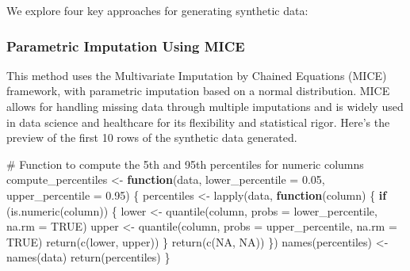 \documentclass[
  letterpaper,
  DIV=11,
  numbers=noendperiod]{scrartcl}
\newenvironment{Shaded}{\begin{snugshade}}{\end{snugshade}}
\newcommand{\AttributeTok}[1]{\textcolor[rgb]{0.40,0.45,0.13}{#1}}
\newcommand{\CommentTok}[1]{\textcolor[rgb]{0.37,0.37,0.37}{#1}}
\newcommand{\ConstantTok}[1]{\textcolor[rgb]{0.56,0.35,0.01}{#1}}
\newcommand{\ControlFlowTok}[1]{\textcolor[rgb]{0.00,0.23,0.31}{\textbf{#1}}}
\newcommand{\FloatTok}[1]{\textcolor[rgb]{0.68,0.00,0.00}{#1}}
\newcommand{\FunctionTok}[1]{\textcolor[rgb]{0.28,0.35,0.67}{#1}}
\newcommand{\NormalTok}[1]{\textcolor[rgb]{0.00,0.23,0.31}{#1}}
\newcommand{\OtherTok}[1]{\textcolor[rgb]{0.00,0.23,0.31}{#1}}
\begin{document}
We explore four key approaches for generating synthetic data:

\subsubsection{Parametric Imputation Using
MICE}\label{parametric-imputation-using-mice}

This method uses the Multivariate Imputation by Chained Equations (MICE)
framework, with parametric imputation based on a normal distribution.
MICE allows for handling missing data through multiple imputations and
is widely used in data science and healthcare for its flexibility and
statistical rigor. Here's the preview of the first 10 rows of the
synthetic data generated.

\begin{Shaded}
\begin{Highlighting}[]
\CommentTok{\# Function to compute the 5th and 95th percentiles for numeric columns}
\NormalTok{compute\_percentiles }\OtherTok{\textless{}{-}} \ControlFlowTok{function}\NormalTok{(data, }\AttributeTok{lower\_percentile =} \FloatTok{0.05}\NormalTok{, }\AttributeTok{upper\_percentile =} \FloatTok{0.95}\NormalTok{) \{}
\NormalTok{  percentiles }\OtherTok{\textless{}{-}} \FunctionTok{lapply}\NormalTok{(data, }\ControlFlowTok{function}\NormalTok{(column) \{}
    \ControlFlowTok{if}\NormalTok{ (}\FunctionTok{is.numeric}\NormalTok{(column)) \{}
\NormalTok{      lower }\OtherTok{\textless{}{-}} \FunctionTok{quantile}\NormalTok{(column, }\AttributeTok{probs =}\NormalTok{ lower\_percentile, }\AttributeTok{na.rm =} \ConstantTok{TRUE}\NormalTok{)}
\NormalTok{      upper }\OtherTok{\textless{}{-}} \FunctionTok{quantile}\NormalTok{(column, }\AttributeTok{probs =}\NormalTok{ upper\_percentile, }\AttributeTok{na.rm =} \ConstantTok{TRUE}\NormalTok{)}
      \FunctionTok{return}\NormalTok{(}\FunctionTok{c}\NormalTok{(lower, upper))}
\NormalTok{    \}}
    \FunctionTok{return}\NormalTok{(}\FunctionTok{c}\NormalTok{(}\ConstantTok{NA}\NormalTok{, }\ConstantTok{NA}\NormalTok{))}
\NormalTok{  \})}
  \FunctionTok{names}\NormalTok{(percentiles) }\OtherTok{\textless{}{-}} \FunctionTok{names}\NormalTok{(data)}
  \FunctionTok{return}\NormalTok{(percentiles)}
\NormalTok{\}}


\end{Highlighting}
\end{Shaded}
\end{document}
